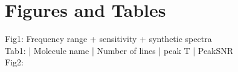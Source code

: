 \section{Figures and Tables}
 Fig1: Frequency range + sensitivity + synthetic spectra\\
 Tab1: | Molecule name | Number of lines | peak T | PeakSNR \\ 
 Fig2: \\
 
  
  
  